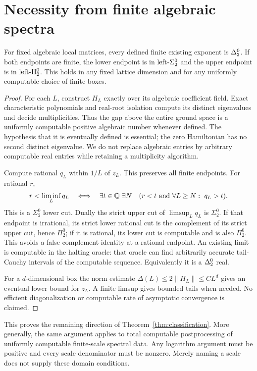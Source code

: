 \section{Necessity from finite algebraic spectra}\label{sec:necessity}
\begin{proposition}\label{prop:necessity}
For fixed algebraic local matrices, every defined finite existing exponent
is $\Delta^0_2$. If both endpoints are finite, the lower endpoint is in
$\text{left-}\Sigma^0_2$ and the upper endpoint is in $\text{left-}\Pi^0_2$. This holds in any fixed
lattice dimension and for any uniformly computable choice of finite
boxes.
\end{proposition}
\begin{proof}
For each $L$, construct $H_L$ exactly over its algebraic coefficient
field. Exact characteristic polynomials and real-root isolation compute
its distinct eigenvalues and decide multiplicities. Thus the gap above
the entire ground space is a uniformly computable positive algebraic
number whenever defined. The hypothesis that it is eventually defined
is essential; the zero Hamiltonian has no second distinct eigenvalue.
We do not replace algebraic entries by arbitrary computable real entries
while retaining a multiplicity algorithm.

Compute rational $q_L$ within $1/L$ of $z_L$. This preserves all finite
endpoints. For rational $r$,
\[
 r<\liminf_Lq_L\quad\Longleftrightarrow\quad
 \exists t\in\mathbb Q\ \exists N\quad
 (r<t\ \text{and}\ \forall L\geq N:\ q_L>t).
\]
This is a $\Sigma^0_2$ lower cut. Dually the strict upper cut of
$\limsup_Lq_L$ is $\Sigma^0_2$. If that endpoint is irrational, its
strict lower rational cut is the complement of its strict upper cut,
hence $\Pi^0_2$; if it is rational, its lower cut is computable and is
also $\Pi^0_2$. This avoids a false complement identity at a rational
endpoint. An existing limit is computable in the halting oracle: that
oracle can find arbitrarily accurate tail-Cauchy intervals of the
computable sequence. Equivalently it is a $\Delta^0_2$ real.

For a $d$-dimensional box the norm estimate
$\Delta(L)\leq2\|H_L\|\leq C L^d$ gives an eventual lower bound for
$z_L$. A finite limsup gives bounded tails when needed. No efficient
diagonalization or computable rate of asymptotic convergence is claimed.
\end{proof}

This proves the remaining direction of
Theorem~\ref{thm:classification}. More generally, the same argument applies
to total computable postprocessing of uniformly computable finite-scale
spectral data. Any logarithm argument must be positive and every scale
denominator must be nonzero. Merely naming a scale does not supply these
domain conditions.

